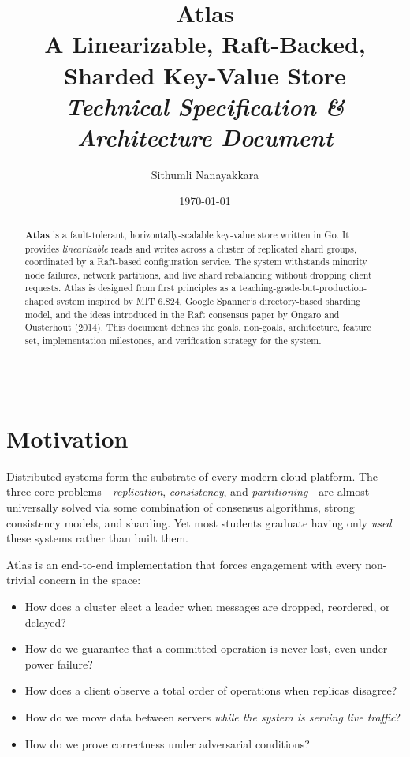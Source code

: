 \documentclass[11pt,a4paper]{article}
\title{
  \vspace{-2em}
  {\color{primary}\Huge\textbf{Atlas}}\\[0.3em]
  {\Large A Linearizable, Raft-Backed, Sharded Key-Value Store}\\[0.5em]
  {\normalsize\color{muted}\textit{Technical Specification \& Architecture Document}}
}
\author{Sithumli Nanayakkara}
\date{\today}
\begin{document}
\maketitle
\thispagestyle{fancy}
\vspace{-1em}

\begin{abstract}
\noindent
\textbf{Atlas} is a fault-tolerant, horizontally-scalable key-value store written in Go. It provides \textit{linearizable} reads and writes across a cluster of replicated shard groups, coordinated by a Raft-based configuration service. The system withstands minority node failures, network partitions, and live shard rebalancing without dropping client requests. Atlas is designed from first principles as a teaching-grade-but-production-shaped system inspired by MIT 6.824, Google Spanner's directory-based sharding model, and the ideas introduced in the Raft consensus paper by Ongaro and Ousterhout (2014). This document defines the goals, non-goals, architecture, feature set, implementation milestones, and verification strategy for the system.
\end{abstract}

\vspace{0.5em}
\hrule
\vspace{1em}

\tableofcontents
\newpage

\section{Motivation}

Distributed systems form the substrate of every modern cloud platform. The three core problems---\textit{replication}, \textit{consistency}, and \textit{partitioning}---are almost universally solved via some combination of consensus algorithms, strong consistency models, and sharding. Yet most students graduate having only \textit{used} these systems rather than built them.

Atlas is an end-to-end implementation that forces engagement with every non-trivial concern in the space:

\begin{itemize}[leftmargin=1.5em,itemsep=0.2em]
  \item How does a cluster elect a leader when messages are dropped, reordered, or delayed?
  \item How do we guarantee that a committed operation is never lost, even under power failure?
  \item How does a client observe a total order of operations when replicas disagree?
  \item How do we move data between servers \textit{while the system is serving live traffic}?
  \item How do we prove correctness under adversarial conditions?
\end{itemize}
\end{document}
